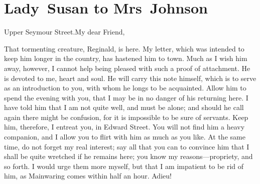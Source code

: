 \chapter{Lady~Susan to Mrs~Johnson}
  
  \begin{mail}{Upper Seymour Street.}{My dear Friend,}
  
  That tormenting creature, Reginald, is here. My letter, which was intended to keep him longer in the country, has hastened him to town. Much as I wish him away, however, I cannot help being pleased with such a proof of attachment. He is devoted to me, heart and soul. He will carry this note himself, which is to serve as an introduction to you, with whom he longs to be acquainted. Allow him to spend the evening with you, that I may be in no danger of his returning here. I have told him that I am not quite well, and must be alone; and should he call again there might be confusion, for it is impossible to be sure of servants. Keep him, therefore, I entreat you, in Edward Street. You will not find him a heavy companion, and I allow you to flirt with him as much as you like. At the same time, do not forget my real interest; say all that you can to convince him that I shall be quite wretched if he remains here; you know my reasons—propriety, and so forth. I would urge them more myself, but that I am impatient to be rid of him, as Mainwaring comes within half an hour. Adieu!  
\end{mail}
